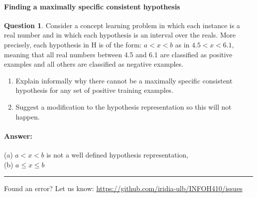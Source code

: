 \documentclass[11pt,a4paper]{article}
\theoremstyle{definition}%
\newtheorem{Q}{Question}[] %
\newcommand{\reponse}[1]{%
\ifthenelse {\boolean{corrige}} {\paragraph{Answer:} \color{darkblue}   #1\color{black}} {}
}
\begin{document}
\paragraph{Finding a maximally specific consistent hypothesis}
\begin{Q}
Consider a concept learning problem in which each instance is a real number and in which
each hypothesis is an interval over the reals. More precisely, each hypothesis in H is of the
form: $a < x < b$ as in $4.5 < x < 6.1$, meaning that all real numbers between 4.5 and 6.1 are
classified as positive examples and all others are classified as negative examples.
\begin{enumerate}
    \item Explain informally why there cannot be a maximally specific consistent hypothesis for
any set of positive training examples.
    \item Suggest a modification to the hypothesis representation so this will not happen.
\end{enumerate}

\reponse{
    (a) $a < x < b$ is not a well defined hypothesis representation,\\
    (b) $a \leq x \leq b$
}
\end{Q}


\noindent
\rule{\textwidth}{0.4pt}
\footnotesize{Found an error? Let us know: \url{https://github.com/iridia-ulb/INFOH410/issues}}
\end{document}
